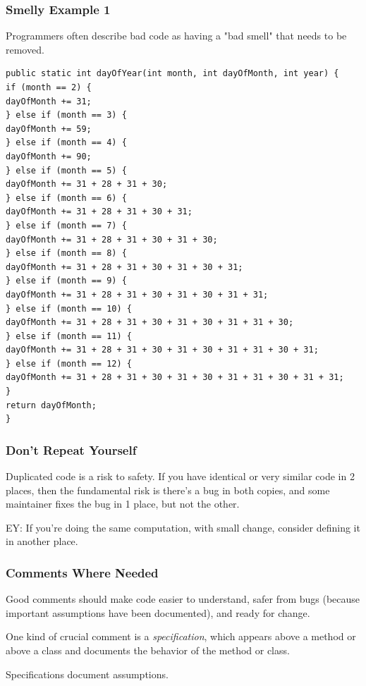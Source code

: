 \documentclass[10pt]{amsart}
\begin{document}
\subsubsection{Smelly Example 1}

Programmers often describe bad code as having a "bad smell" that needs to be removed.

\begin{verbatim}
public static int dayOfYear(int month, int dayOfMonth, int year) {
if (month == 2) {
dayOfMonth += 31;
} else if (month == 3) {
dayOfMonth += 59;
} else if (month == 4) {
dayOfMonth += 90;
} else if (month == 5) {
dayOfMonth += 31 + 28 + 31 + 30;
} else if (month == 6) {
dayOfMonth += 31 + 28 + 31 + 30 + 31;
} else if (month == 7) {
dayOfMonth += 31 + 28 + 31 + 30 + 31 + 30;
} else if (month == 8) {
dayOfMonth += 31 + 28 + 31 + 30 + 31 + 30 + 31;
} else if (month == 9) {
dayOfMonth += 31 + 28 + 31 + 30 + 31 + 30 + 31 + 31;
} else if (month == 10) {
dayOfMonth += 31 + 28 + 31 + 30 + 31 + 30 + 31 + 31 + 30;
} else if (month == 11) {
dayOfMonth += 31 + 28 + 31 + 30 + 31 + 30 + 31 + 31 + 30 + 31;
} else if (month == 12) {
dayOfMonth += 31 + 28 + 31 + 30 + 31 + 30 + 31 + 31 + 30 + 31 + 31;
}
return dayOfMonth;
}
\end{verbatim}

\subsubsection{Don't Repeat Yourself}

Duplicated code is a risk to safety. If you have identical or very similar code in 2 places, then the fundamental risk is there's a bug in both copies, and some maintainer fixes the bug in 1 place, but not the other.

EY: If you're doing the same computation, with small change, consider defining it in another place.

\subsubsection{Comments Where Needed}

Good comments should make code easier to understand, safer from bugs (because important assumptions have been documented), and ready for change.

One kind of crucial comment is a \emph{specification}, which appears above a method or above a class and documents the behavior of the method or class.

Specifications document assumptions. 
\end{document}
